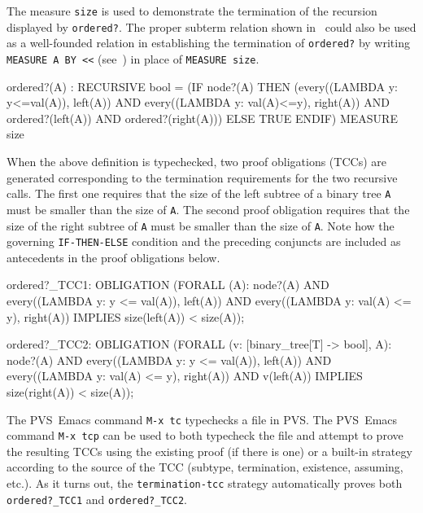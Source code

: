 \documentclass[11pt,twoside]{book}
\newcommand{\pvsref}[1]{\fbox{\footnotesize\ref{#1}}} \def\id#1{\hbox{\textt{#1}}} %
\begin{document}
The measure \texttt{size} is used to demonstrate the termination of the
recursion displayed by \texttt{ordered?}\@.  The proper subterm relation
shown in~\pvsref{propersubterm} could also be used as a well-founded
relation in establishing the termination of \texttt{ordered?} by
writing \texttt{MEASURE A BY <<} (see~\pvsref{aritheval}) in place of \texttt{MEASURE size}\@.    
\begin{session*}\label{ordered?}
ordered?(A) : RECURSIVE bool =
  (IF node?(A) THEN (every((LAMBDA y: y<=val(A)), left(A)) AND
                     every((LAMBDA y: val(A)<=y), right(A)) AND
                     ordered?(left(A)) AND
                     ordered?(right(A)))
         ELSE TRUE ENDIF)
  MEASURE size
\end{session*}
When the above definition is typechecked, two proof obligations (TCCs)
are generated corresponding to the termination requirements for the
two recursive calls.  The first one requires that the size of the left
subtree of a binary tree \texttt{A} must be smaller than the size of 
\texttt{A}\@.   The second proof obligation requires that the size of the
right subtree of \texttt{A} must be smaller than the size of \texttt{A}\@.  
Note how the governing \texttt{IF-THEN-ELSE} condition and the preceding
conjuncts are  included as antecedents in the proof obligations below.
\begin{session*}
ordered?_TCC1: OBLIGATION
      (FORALL (A):
         node?(A)
             AND every((LAMBDA y: y <= val(A)), left(A))
               AND every((LAMBDA y: val(A) <= y), right(A))
             IMPLIES size(left(A)) < size(A));

ordered?_TCC2: OBLIGATION
      (FORALL (v: [binary_tree[T] -> bool], A):
         node?(A)
             AND every((LAMBDA y: y <= val(A)), left(A))
               AND every((LAMBDA y: val(A) <= y), right(A)) AND v(left(A))
             IMPLIES size(right(A)) < size(A));
\end{session*}
The PVS~Emacs command \texttt{M-x tc} typechecks a file in PVS\@.  The
PVS~Emacs command \texttt{M-x tcp} can be used to both typecheck the file
and attempt to prove the resulting TCCs using the existing proof (if
there is one) or a built-in strategy according to the source
of the TCC (subtype, termination, existence, assuming, etc.).  As it turns
out, the \texttt{termination-tcc} strategy automatically proves both
\texttt{ordered?\_TCC1} and  \texttt{ordered?\_TCC2}\@.
\end{document}
